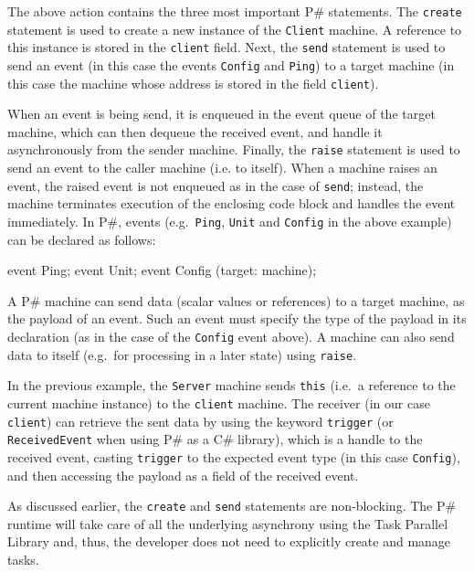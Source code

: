 \documentclass{llncs}
\newcommand{\ps}{P\#\xspace}
\newcommand{\cs}{C\#\xspace}
\begin{document}
\noindent
The above action contains the three most important \ps statements. The \texttt{create} statement is used to create a new instance of the \texttt{Client} machine. A reference to this instance is stored in the \texttt{client} field. Next, the \texttt{send} statement is used to send an event (in this case the events \texttt{Config} and \texttt{Ping}) to a target machine (in this case the machine whose address is stored in the field \texttt{client}).

When an event is being send, it is enqueued in the event queue of the target machine, which can then dequeue the received event, and handle it asynchronously from the sender machine. Finally, the \texttt{raise} statement is used to send an event to the caller machine (i.e. to itself). When a machine raises an event, the raised event is not enqueued as in the case of \texttt{send}; instead, the machine terminates execution of the enclosing code block and handles the event immediately. In \ps, events (e.g.\ \texttt{Ping}, \texttt{Unit} and \texttt{Config} in the above example) can be declared as follows:

\begin{psharpNoLines}
event Ping;
event Unit;
event Config (target: machine);
\end{psharpNoLines}

\noindent
A \ps machine can send data (scalar values or references) to a target machine, as the payload of an event. Such an event must specify the type of the payload in its declaration (as in the case of the \texttt{Config} event above). A machine can also send data to itself (e.g.\ for processing in a later state) using \texttt{raise}.

In the previous example, the \texttt{Server} machine sends \texttt{this} (i.e.\ a reference to the current machine instance) to the \texttt{client} machine. The receiver (in our case \texttt{client}) can retrieve the sent data by using the keyword \texttt{trigger} (or \texttt{ReceivedEvent} when using \ps as a \cs library), which is a handle to the received event, casting \texttt{trigger} to the expected event type (in this case \texttt{Config}), and then accessing the payload as a field of the received event.

As discussed earlier, the \texttt{create} and \texttt{send} statements are non-blocking. The \ps runtime will take care of all the underlying asynchrony using the Task Parallel Library and, thus, the developer does not need to explicitly create and manage tasks.
\end{document}
